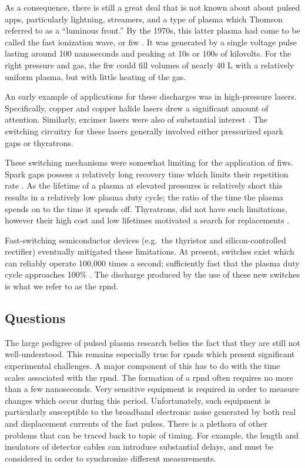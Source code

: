 As a consequence, there is still a great deal that is not known about about
pulsed \acs{app}s, particularly lightning, streamers, and a type of plasma which
Thomson referred to as a ``luminous front.'' By the 1970s, this latter plasma
had come to be called the fast ionization wave, or \acs{fiw}
\cite{Vasilyak1994}. It was generated by a single voltage pulse lasting around
100 nanoseconds and peaking at 10s or 100s of kilovolts. For the right pressure
and gas, the \acs{fiw} could fill volumes of nearly 40 L with a relatively
uniform plasma, but with little heating of the gas.

An early example of applications for these discharges was in high-pressure
lasers. Specifically, copper \cite{Kushner1983} and copper halide
\cite{Pack1977} lasers drew a significant amount of attention. Similarly,
excimer lasers were also of substantial interest \cite{Shimada1985}. The
switching circuitry for these lasers generally involved either pressurized spark
gaps or thyratrons.

These switching mechanisms were somewhat limiting for the application of
\acs{fiw}s. Spark gaps possess a relatively long recovery time which limits
their repetition rate \cite{Moran1991}. As the lifetime of a plasma at elevated
pressures is relatively short this results in a relatively low plasma duty
cycle; the ratio of the time the plasma spends on to the time it spends off.
Thyratrons, did not have such limitations, however their high cost and low
lifetimes motivated a search for replacements \cite{Partlo1995}.

Fast-switching semiconductor devices (e.g.\ the thyristor and silicon-controlled
rectifier) eventually mitigated these limitations. At present, switches exist
which can reliably operate 100,000 times a second; sufficiently fast that the
plasma duty cycle approaches 100\% \cite{Efanov1997}. The discharge produced by
the use of these new switches is what we refer to as the \acs{rpnd}.

\subsection{Questions}

The large pedigree of pulsed plasma research belies the fact that they are still
not well-understood. This remains especially true for \acs{rpnd}s which present
significant experimental challenges. A major component of this has to do with
the time scales associated with the \acs{rpnd}. The formation of a \acs{rpnd}
often requires no more than a few nanoseconds. Very sensitive equipment is
required in order to measure changes which occur during this period.
Unfortunately, such equipment is particularly susceptible to the broadband
electronic noise generated by both real and displacement currents of the fast
pulses. There is a plethora of other problems that can be traced back to topic
of timing. For example, the length and insulators of detector cables can
introduce substantial delays, and must be considered in order to synchronize
different measurements.

